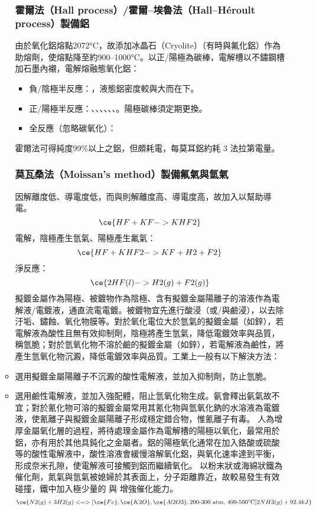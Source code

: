 \documentclass[a4paper,12pt]{report}
\begin{document}
\begin{itemize}
\begin{itemize}
\subsubsection{霍爾法（Hall process）/霍爾–埃魯法（Hall–Héroult process）製備鋁}
由於氧化鋁熔點2072°C，故添加冰晶石（Cryolite）（有時與氟化鋁）作為助熔劑，使熔點降至約900–1000°C。以正/陽極為碳棒，電解槽以不鏽鋼槽加石墨內襯，電解熔融態氧化鋁：
\begin{itemize}
\item 負/陰極半反應：，液態鋁密度較與大而在下。
\item 正/陽極半反應：、、、、、、。陽極碳棒須定期更換。
\item 全反應（忽略碳氧化）：
\end{itemize}
霍爾法可得純度99\%以上之鋁，但頗耗電，每莫耳鋁約耗 3 法拉第電量。
\subsubsection{莫瓦桑法（Moissan's method）製備氟氣與氫氣}
因解離度低、導電度低，而與則解離度高、導電度高，故加入以幫助導電。
\[\ce{HF + KF -> KHF2}\]
電解，陰極產生氫氣、陽極產生氟氣：
\[\ce{HF + KHF2 -> KF + H2 + F2}\]
淨反應：
\[\ce{2HF(l) -> H2(g) + F2(g)}\]
擬鍍金屬作為陽極、被鍍物作為陰極、含有擬鍍金屬陽離子的溶液作為電解液/電鍍液，通直流電電鍍。被鍍物宜先進行酸浸（或/與鹼浸），以去除汙垢、鏽蝕、氧化物膜等。對於氧化電位大於氫氣的擬鍍金屬（如鋅），若電解液為酸性且無有效抑制劑，陰極將產生氫氣，降低電鍍效率與品質，稱氫脆；對於氫氧化物不溶於鹼的擬鍍金屬（如鋅），若電解液為鹼性，將產生氫氧化物沉澱，降低電鍍效率與品質。工業上一般有以下解決方法：
\bit
\item 選用擬鍍金屬陽離子不沉澱的酸性電解液，並加入抑制劑，防止氫脆。
\item 選用鹼性電解液，並加入強配體，阻止氫氧化物生成。氨會釋出氨氣故不宜；對於氰化物可溶的擬鍍金屬常用其氰化物與氫氧化鈉的水溶液為電鍍液，使氰離子與擬鍍金屬陽離子形成穩定錯合物，惟氰離子有毒。
\eit
{}
人為增厚金屬氧化層的過程，將待處理金屬作為電解槽的陽極以氧化，最常用於鋁，亦有用於其他具鈍化之金屬者。鋁的陽極氧化通常在加入鉻酸或硫酸等的酸性電解液中，酸性溶液會緩慢溶解氧化鋁，與氧化速率達到平衡，形成奈米孔隙，使電解液可接觸到鋁而繼續氧化。
以粉末狀或海綿狀鐵為催化劑，氮氣與氫氣被媳婦於其表面上，分子距離靠近，故較易發生有效碰撞，鐵中加入極少量的 與 增強催化能力。
\[\ce{N2(g) + 3H2(g) <=>[\ce{Fe}, \ce{K2O}, \ce{Al2O3}, \text{200-300 atm, 400-500°C}] 2NH3(g) + 92.4kJ}\]

\end{itemize}
\end{itemize}
\end{document}
